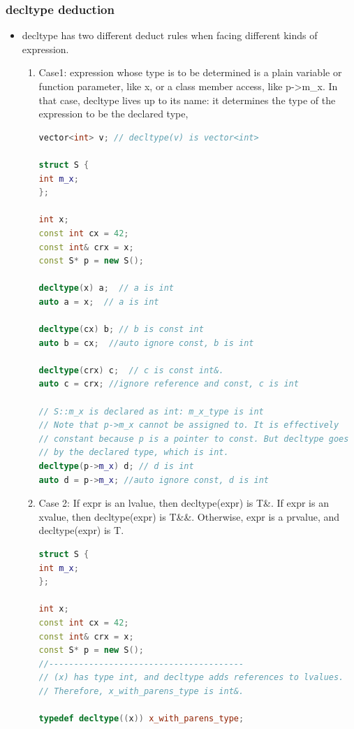 \documentclass[a4paper,12pt,twoside]{book}
\begin{document}
\subsubsection{decltype deduction}
\begin{itemize}
	\item decltype has two different deduct rules when facing different kinds of expression.
	
	\begin{enumerate}
		\item Case1: expression whose type is to be determined is a plain variable or function parameter, like x, or a class member access, like p->m\_x. In that case, decltype lives up to its name: it determines the type of the expression to be the declared type,
\begin{lstlisting}[frame=single, language=c++]
vector<int> v; // decltype(v) is vector<int>

struct S {
int m_x;
};

int x;
const int cx = 42;
const int& crx = x;
const S* p = new S();

decltype(x) a;  // a is int
auto a = x;  // a is int

decltype(cx) b; // b is const int
auto b = cx;  //auto ignore const, b is int

decltype(crx) c;  // c is const int&.
auto c = crx; //ignore reference and const, c is int

// S::m_x is declared as int: m_x_type is int
// Note that p->m_x cannot be assigned to. It is effectively
// constant because p is a pointer to const. But decltype goes
// by the declared type, which is int.
decltype(p->m_x) d; // d is int
auto d = p->m_x; //auto ignore const, d is int
\end{lstlisting}
		
		\item Case 2: If expr is an lvalue, then decltype(expr) is T\&. If expr is an xvalue, then decltype(expr) is T\&\&. Otherwise, expr is a prvalue, and decltype(expr) is T.
		
\begin{lstlisting}[frame=single, language=c++]
struct S {
int m_x;
};

int x;
const int cx = 42;
const int& crx = x;
const S* p = new S();
//---------------------------------------
// (x) has type int, and decltype adds references to lvalues.
// Therefore, x_with_parens_type is int&.

typedef decltype((x)) x_with_parens_type;


\end{lstlisting}
\end{enumerate}
\end{itemize}
\end{document}
